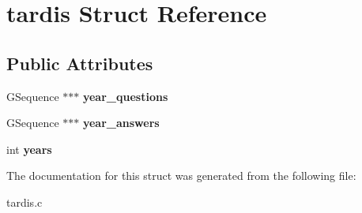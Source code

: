 \hypertarget{structtardis}{}\section{tardis Struct Reference}
\label{structtardis}
\subsection*{Public Attributes}
\begin{DoxyCompactItemize}
\item 
G\+Sequence $\ast$$\ast$$\ast$ {\bfseries year\+\_\+questions}\hypertarget{structtardis_afd6beabb3d29119b6e2d6fc0e93798e4}{}\label{structtardis_afd6beabb3d29119b6e2d6fc0e93798e4}

\item 
G\+Sequence $\ast$$\ast$$\ast$ {\bfseries year\+\_\+answers}\hypertarget{structtardis_a8accef0ba68c0ebe7df616e6e8615c22}{}\label{structtardis_a8accef0ba68c0ebe7df616e6e8615c22}

\item 
int {\bfseries years}\hypertarget{structtardis_a92d1ec84293d817312ac3b5c80aa4f8b}{}\label{structtardis_a92d1ec84293d817312ac3b5c80aa4f8b}

\end{DoxyCompactItemize}


The documentation for this struct was generated from the following file\+:\begin{DoxyCompactItemize}
\item 
tardis.\+c\end{DoxyCompactItemize}
